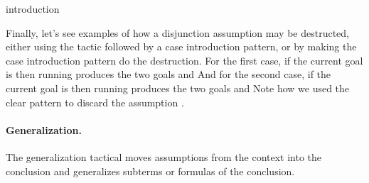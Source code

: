 \begin{tactic}[$\tau$=>$\;\iota_1 \cdots \iota_n$]{introduction}
\begin{tsyntax}[empty]{}
    Finally, let's see examples of how a disjunction assumption
    may be destructed, either using the  tactic followed
    by a case introduction pattern, or by making the
    case introduction pattern do the destruction.
    For the first case, if the current goal is
    then running
    produces the two goals
    and
    And for the second case, if the current goal is
    then running
    produces the two goals
    and
    Note how we used the clear pattern to discard the assumption
    .
  \end{tsyntax}
\end{tactic}

\paragraph{Generalization.}

The generalization tactical moves assumptions from the context into
the conclusion and generalizes subterms or formulas of the conclusion.

